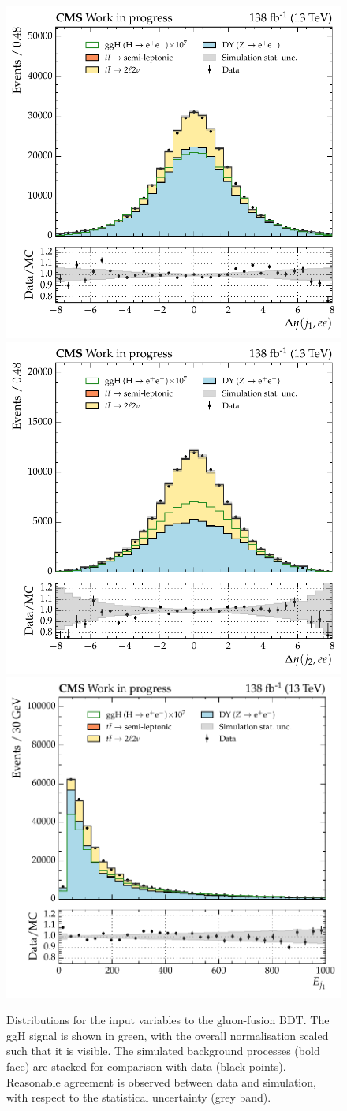 \begin{figure}[htbp!]
\includegraphics[width =0.33\linewidth]{Figures/Hee/ggH/dataMC/all_inputs/ggH_BDT_pt_reweighted_leadJetDieleDEta.pdf}\hfill%
\includegraphics[width =0.33\linewidth]{Figures/Hee/ggH/dataMC/all_inputs/ggH_BDT_pt_reweighted_subleadJetDieleDEta.pdf}\hfill%
\includegraphics[width =0.33\linewidth]{Figures/Hee/ggH/dataMC/all_inputs/ggH_BDT_pt_reweighted_leadJetEn.pdf}\hfill%
 
\caption{Distributions for the input variables to the gluon-fusion BDT. The ggH signal is shown in green, with the overall normalisation scaled such that it is visible. The simulated background processes (bold face) are stacked for comparison with data (black points). Reasonable agreement is observed between data and simulation, with respect to the statistical uncertainty (grey band).}
\label{fig:ggH_inputs_second}
\end{figure}
 
